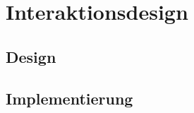 \chapter{Interaktionsdesign}
\section{Design} \label{sec:interactionDesign}

\section{Implementierung} \label{sec:interactionImplementation}

